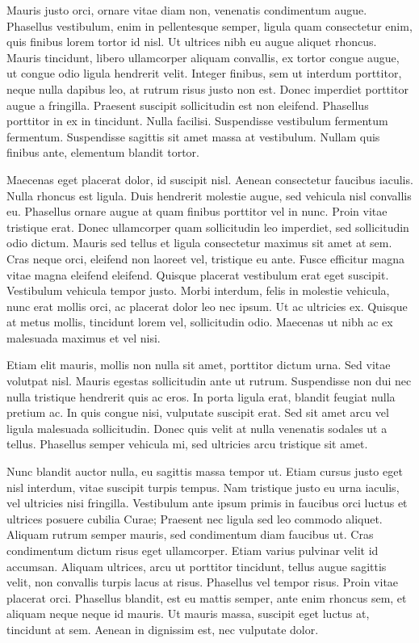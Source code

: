 \begin{multicols}{2}

\noindent
Mauris justo orci, ornare vitae diam non, venenatis condimentum augue. Phasellus vestibulum, enim in pellentesque semper, ligula quam consectetur enim, quis finibus lorem tortor id nisl. Ut ultrices nibh eu augue aliquet rhoncus. Mauris tincidunt, libero ullamcorper aliquam convallis, ex tortor congue augue, ut congue odio ligula hendrerit velit. Integer finibus, sem ut interdum porttitor, neque nulla dapibus leo, at rutrum risus justo non est. Donec imperdiet porttitor augue a fringilla. Praesent suscipit sollicitudin est non eleifend. Phasellus porttitor in ex in tincidunt. Nulla facilisi. Suspendisse vestibulum fermentum fermentum. Suspendisse sagittis sit amet massa at vestibulum. Nullam quis finibus ante, elementum blandit tortor.

Maecenas eget placerat dolor, id suscipit nisl. Aenean consectetur faucibus iaculis. Nulla rhoncus est ligula. Duis hendrerit molestie augue, sed vehicula nisl convallis eu. Phasellus ornare augue at quam finibus porttitor vel in nunc. Proin vitae tristique erat. Donec ullamcorper quam sollicitudin leo imperdiet, sed sollicitudin odio dictum. Mauris sed tellus et ligula consectetur maximus sit amet at sem. Cras neque orci, eleifend non laoreet vel, tristique eu ante. Fusce efficitur magna vitae magna eleifend eleifend. Quisque placerat vestibulum erat eget suscipit. Vestibulum vehicula tempor justo. Morbi interdum, felis in molestie vehicula, nunc erat mollis orci, ac placerat dolor leo nec ipsum. Ut ac ultricies ex. Quisque at metus mollis, tincidunt lorem vel, sollicitudin odio. Maecenas ut nibh ac ex malesuada maximus et vel nisi.

Etiam elit mauris, mollis non nulla sit amet, porttitor dictum urna. Sed vitae volutpat nisl. Mauris egestas sollicitudin ante ut rutrum. Suspendisse non dui nec nulla tristique hendrerit quis ac eros. In porta ligula erat, blandit feugiat nulla pretium ac. In quis congue nisi, vulputate suscipit erat. Sed sit amet arcu vel ligula malesuada sollicitudin. Donec quis velit at nulla venenatis sodales ut a tellus. Phasellus semper vehicula mi, sed ultricies arcu tristique sit amet.

Nunc blandit auctor nulla, eu sagittis massa tempor ut. Etiam cursus justo eget nisl interdum, vitae suscipit turpis tempus. Nam tristique justo eu urna iaculis, vel ultricies nisi fringilla. Vestibulum ante ipsum primis in faucibus orci luctus et ultrices posuere cubilia Curae; Praesent nec ligula sed leo commodo aliquet. Aliquam rutrum semper mauris, sed condimentum diam faucibus ut. Cras condimentum dictum risus eget ullamcorper. Etiam varius pulvinar velit id accumsan. Aliquam ultrices, arcu ut porttitor tincidunt, tellus augue sagittis velit, non convallis turpis lacus at risus. Phasellus vel tempor risus. Proin vitae placerat orci. Phasellus blandit, est eu mattis semper, ante enim rhoncus sem, et aliquam neque neque id mauris. Ut mauris massa, suscipit eget luctus at, tincidunt at sem. Aenean in dignissim est, nec vulputate dolor.


\end{multicols}
